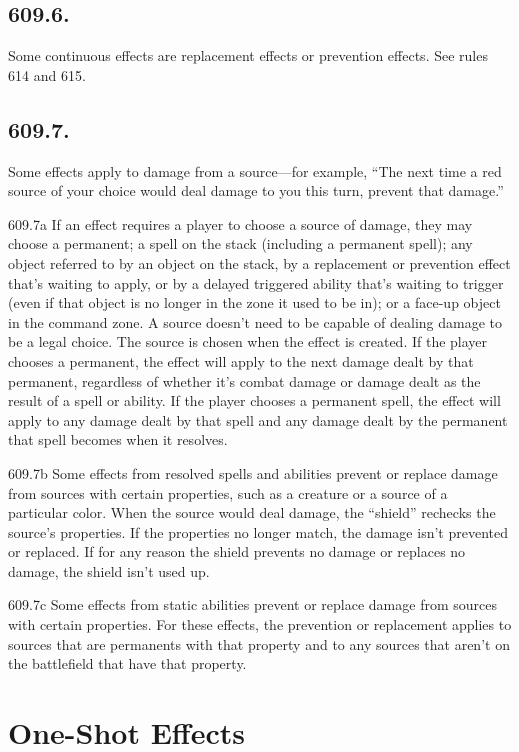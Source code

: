 \subsection*{609.6.}
Some continuous effects are replacement effects or prevention effects. See rules 614 and 615.

\subsection*{609.7.}
Some effects apply to damage from a source—for example, “The next time a red source of your choice would deal damage to you this turn, prevent that damage.”

609.7a If an effect requires a player to choose a source of damage, they may choose a permanent; a spell on the stack (including a permanent spell); any object referred to by an object on the stack, by a replacement or prevention effect that’s waiting to apply, or by a delayed triggered ability that’s waiting to trigger (even if that object is no longer in the zone it used to be in); or a face-up object in the command zone. A source doesn’t need to be capable of dealing damage to be a legal choice. The source is chosen when the effect is created. If the player chooses a permanent, the effect will apply to the next damage dealt by that permanent, regardless of whether it’s combat damage or damage dealt as the result of a spell or ability. If the player chooses a permanent spell, the effect will apply to any damage dealt by that spell and any damage dealt by the permanent that spell becomes when it resolves.

609.7b Some effects from resolved spells and abilities prevent or replace damage from sources with certain properties, such as a creature or a source of a particular color. When the source would deal damage, the “shield” rechecks the source’s properties. If the properties no longer match, the damage isn’t prevented or replaced. If for any reason the shield prevents no damage or replaces no damage, the shield isn’t used up.

609.7c Some effects from static abilities prevent or replace damage from sources with certain properties. For these effects, the prevention or replacement applies to sources that are permanents with that property and to any sources that aren’t on the battlefield that have that property.

\section{One-Shot Effects}
